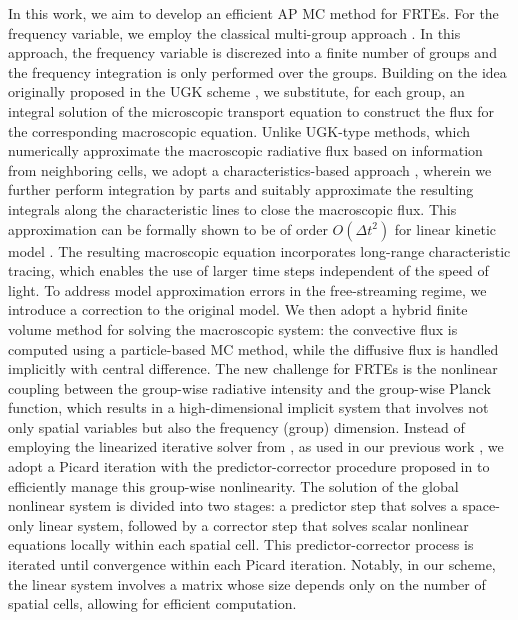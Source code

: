 \documentclass[preprint,12pt]{elsarticle}
\theoremstyle{definition}
\theoremstyle{plain}
\numberwithin{equation}{section}
\numberwithin{algorithm}{section}
\newcounter{eq_count}
\newcounter{tab_count}
\begin{document}
In this work, we aim to develop an efficient AP MC method for FRTEs. For the frequency variable, we employ the classical multi-group approach \cite{pomraning2005equations}. In this approach, the frequency variable is discrezed into a finite number of groups and the frequency integration is only performed over the groups. Building on the idea originally proposed in the UGK scheme \cite{xu2010unified, mieussens2013asymptotic}, we substitute, for each group, an integral solution of the microscopic transport equation to construct the flux for the corresponding macroscopic equation.  Unlike UGK-type methods, which numerically approximate the macroscopic radiative flux based on information from neighboring cells, we adopt a characteristics-based approach \cite{shi2023efficient,zhang2023asymptotic,cai2024asymptotic}, wherein we further perform integration by parts and suitably approximate the resulting integrals along the characteristic lines to close the macroscopic flux. This approximation can be formally shown to be of order $O(\Delta t^2)$ for linear kinetic model \cite{zhang2023asymptotic,cai2024asymptotic}. The resulting macroscopic equation incorporates long-range characteristic tracing, which enables the use of larger time steps independent of the speed of light. To address model approximation errors in the free-streaming regime, we introduce a correction to the original model. We then adopt a hybrid finite volume method for solving the macroscopic system: the convective flux is computed using a particle-based MC method, while the diffusive flux is handled implicitly with central difference.
The new challenge for FRTEs is the nonlinear coupling between the group-wise radiative intensity and the group-wise Planck function, which results in a high-dimensional implicit system that involves not only spatial variables but also the frequency (group) dimension.
 Instead of employing the linearized iterative solver from \cite{sun2015asymptoticB,sun2015asymptoticA}, as used in our previous work \cite{shi2023efficient}, we adopt a Picard iteration  with the predictor-corrector procedure proposed in \cite{tang2021accurate} to efficiently manage this group-wise nonlinearity.
 The solution of the global nonlinear system is divided into two stages: a predictor step that solves a space-only linear system, followed by a corrector step that solves  scalar nonlinear equations locally within each spatial cell. This predictor-corrector process is iterated until convergence within each Picard iteration.
 Notably, in our scheme, the linear system involves a matrix whose size depends only on the number of spatial cells, allowing for efficient computation.
\end{document}
